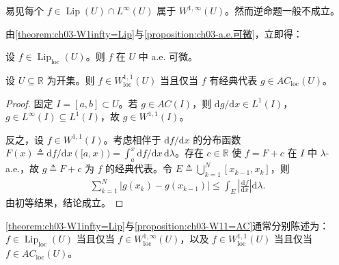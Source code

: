 \documentclass[../../main.tex]{subfiles}%
\begin{document}
\begin{remark}\label{remark:ch03-Lip含W1infty}
易见每个 $f\in\operatorname{Lip}(U)\cap L^\infty(U)$ 属于 $W^{1,\infty}(U)$。然而逆命题一般不成立。
\end{remark}

由\cref{theorem:ch03-W1infty=Lip}与\cref{proposition:ch03-a.e.可微}，立即得：

\begin{corollary}[Rademacher]\label{corollary:ch03-Rademacher}
设 $f\in\operatorname{Lip}_{\mathrm{loc}}(U)$。则 $f$ 在 $U$ 中 a.e. 可微。
\end{corollary}

\begin{proposition}\label{proposition:ch03-W11=AC}\label{proposition:ch03-Sobolev刻画}
设 $U\subseteq\mathbb{R}$ 为开集。则 $f\in W^{1,1}_{\mathrm{loc}}(U)$ 当且仅当 $f$ 有经典代表 $g\in AC_{\mathrm{loc}}(U)$。
\end{proposition}

\begin{proof}
固定 $I=[a,b]\subset U$。若 $g\in AC(I)$，则 $\mathrm{d}g/\mathrm{d}x\in L^1(I)$，$g\in L^\infty(I)\subseteq L^1(I)$，故 $g\in W^{1,1}(I)$。

反之，设 $f\in W^{1,1}(I)$。考虑相伴于 $\mathrm{d}f/\mathrm{d}x$ 的分布函数 $F(x)\triangleq \mathrm{d}f/\mathrm{d}x([a,x))=\int_a^x\mathrm{d}f/\mathrm{d}x\,\mathrm{d}\lambda$。存在 $c\in\mathbb{R}$ 使 $f=F+c$ 在 $I$ 中 $\lambda$-a.e.，故 $g\triangleq F+c$ 为 $f$ 的经典代表。令 $E\triangleq \bigcup_{k=1}^N[x_{k-1},x_k]$，则
\begin{align*}
\sum_{k=1}^N|g(x_k)-g(x_{k-1})|
\leqslant\int_E\left|\frac{\mathrm{d}f}{\mathrm{d}x}\right|\mathrm{d}\lambda.
\end{align*}
由初等结果，结论成立。
\end{proof}

\cref{theorem:ch03-W1infty=Lip}与\cref{proposition:ch03-W11=AC}通常分别陈述为：$f\in\operatorname{Lip}_{\mathrm{loc}}(U)$ 当且仅当 $f\in W^{1,\infty}_{\mathrm{loc}}(U)$，以及 $f\in W^{1,1}_{\mathrm{loc}}(U)$ 当且仅当 $f\in AC_{\mathrm{loc}}(U)$。
\end{document}

